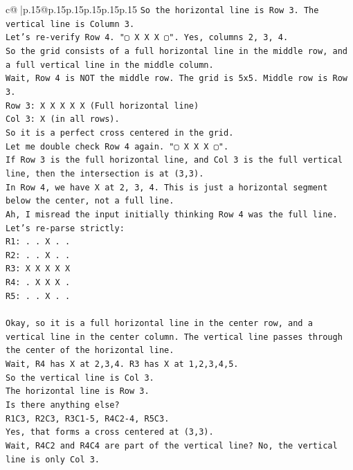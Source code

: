 \documentclass{article}
\begin{document}
{\begin{supertabular}{c@{$\;$}|p{.15\linewidth}@{}p{.15\linewidth}p{.15\linewidth}p{.15\linewidth}p{.15\linewidth}p{.15\linewidth}}
{{{\texttt{So the horizontal line is Row 3. The vertical line is Column 3.} \\
\texttt{Let's re{-}verify Row 4. "▢ X X X ▢". Yes, columns 2, 3, 4.} \\
\texttt{So the grid consists of a full horizontal line in the middle row, and a full vertical line in the middle column.} \\
\texttt{Wait, Row 4 is NOT the middle row. The grid is 5x5. Middle row is Row 3.} \\
\texttt{Row 3: X X X X X (Full horizontal line)} \\
\texttt{Col 3: X (in all rows).} \\
\texttt{So it is a perfect cross centered in the grid.} \\
\texttt{Let me double check Row 4 again. "▢ X X X ▢".} \\
\texttt{If Row 3 is the full horizontal line, and Col 3 is the full vertical line, then the intersection is at (3,3).} \\
\texttt{In Row 4, we have X at 2, 3, 4. This is just a horizontal segment below the center, not a full line.} \\
\texttt{Ah, I misread the input initially thinking Row 4 was the full line.} \\
\texttt{Let's re{-}parse strictly:} \\
\texttt{R1: . . X . .} \\
\texttt{R2: . . X . .} \\
\texttt{R3: X X X X X} \\
\texttt{R4: . X X X .} \\
\texttt{R5: . . X . .} \\
\\ 
\texttt{Okay, so it is a full horizontal line in the center row, and a vertical line in the center column. The vertical line passes through the center of the horizontal line.} \\
\texttt{Wait, R4 has X at 2,3,4. R3 has X at 1,2,3,4,5.} \\
\texttt{So the vertical line is Col 3.} \\
\texttt{The horizontal line is Row 3.} \\
\texttt{Is there anything else?} \\
\texttt{R1C3, R2C3, R3C1{-}5, R4C2{-}4, R5C3.} \\
\texttt{Yes, that forms a cross centered at (3,3).} \\
\texttt{Wait, R4C2 and R4C4 are part of the vertical line? No, the vertical line is only Col 3.} \\
}}}
\end{supertabular}}
\end{document}
